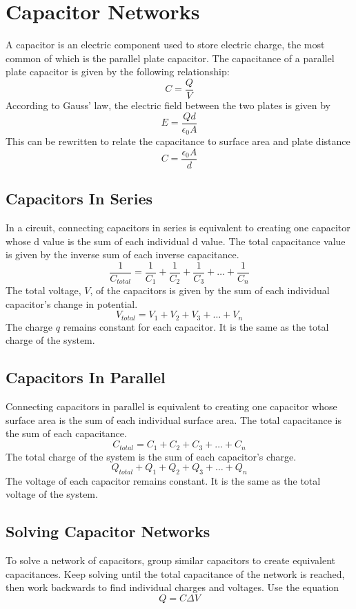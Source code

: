 \documentclass{article}
\begin{document}
\section{Capacitor Networks}
A capacitor is an electric component used to store electric charge, the most common of which is the parallel plate capacitor.  The capacitance of a parallel plate capacitor is given by the following relationship:
\[C=\frac{Q}{V}\]
According to Gauss' law, the electric field between the two plates is given by
\[E=\frac{Qd}{\epsilon_0A}\]
This can be rewritten to relate the capacitance to surface area and plate distance
\[C=\frac{\epsilon_0A}{d}\]
\subsection{Capacitors In Series}
In a circuit, connecting capacitors in series is equivalent to creating one capacitor whose d value is the sum of each individual d value.  The total capacitance value is given by the inverse sum of each inverse capacitance.
\[\frac{1}{C_{total}} = \frac{1}{C_1} + \frac{1}{C_2} + \frac{1}{C_3} + \ldots +\frac{1}{C_n}\]
The total voltage, $V$, of the capacitors is given by the sum of each individual capacitor's change in potential.
\[V_{total} = V_1 + V_2 + V_3 + \ldots + V_n\]
The charge $q$ remains constant for each capacitor.  It is the same as the total charge of the system.
\subsection{Capacitors In Parallel}
Connecting capacitors in parallel is equivalent to creating one capacitor whose surface area is the sum of each individual surface area.  The total capacitance is the sum of each capacitance.
\[C_{total} = C_1 + C_2 + C_3 + \ldots + C_n\]
The total charge of the system is the sum of each capacitor's charge.
\[Q_{total} + Q_1 + Q_2 + Q_3 + \ldots + Q_n\]
The voltage of each capacitor remains constant.  It is the same as the total voltage of the system.
\subsection{Solving Capacitor Networks}
To solve a network of capacitors, group similar capacitors to create equivalent capacitances.  Keep solving until the total capacitance of the network is reached, then work backwards to find individual charges and voltages.  Use the equation
\[Q = C \Delta V\]
\end{document}
